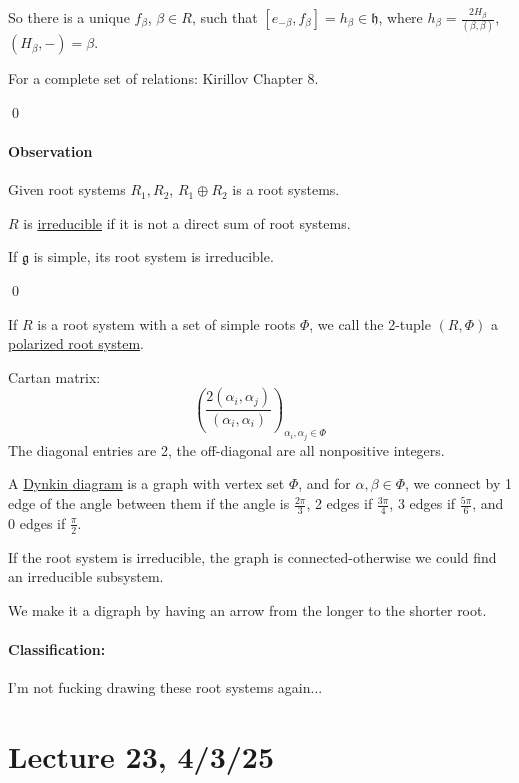 \documentclass[x11names,reqno,14pt]{extarticle}
\newcommand{\mk}[1]{\mathfrak{#1}}
\newcommand{\g}{\mk{g}}
\newcommand{\h}{\mk{h}}
\begin{document}
So there is a unique $f_\beta$, $\beta \in R$, such that $[e_{-\beta},f_\beta] = h_\beta \in \h$, where $h_\beta = \frac{2H_\beta}{(\beta,\beta)}$, $(H_\beta,-) = \beta$. 

For a complete set of relations: Kirillov Chapter 8. 

\qed

\paragraph{Observation}

Given root systems $R_1, R_2$, $R_1\oplus R_2$ is a root systems. 


$R$ is \underline{irreducible} if it is not a direct sum of root systems. 

\lem

If $\g$ is simple, its root system is irreducible. 

\proof

\qed


If $R$ is a root system with a set of simple roots $\Phi$, we call the 2-tuple $(R,\Phi)$ a \underline{polarized root system}. 

Cartan matrix: 
\[
(\frac{2(\alpha_i,\alpha_j)}{(\alpha_i,\alpha_i)})_{\alpha_i,\alpha_j\in \Phi}
\]
The diagonal entries are 2, the off-diagonal are all nonpositive integers. 


A \underline{Dynkin diagram} is a graph with vertex set $\Phi$, and for $\alpha,\beta\in\Phi$, we connect by 1 edge of the angle between them if the angle is $\frac{2\pi}{3}$, 2 edges if $\frac{3\pi}{4}$, 3 edges if $\frac{5\pi}{6}$, and 0 edges if $\frac{\pi}{2}$. 

If the root system is irreducible, the graph is connected-otherwise we could find an irreducible subsystem. 

We make it a digraph by having an arrow from the longer to the shorter root. 

\paragraph{Classification:}

I'm not fucking drawing these root systems again...

\section*{Lecture 23, 4/3/25}
\end{document}
